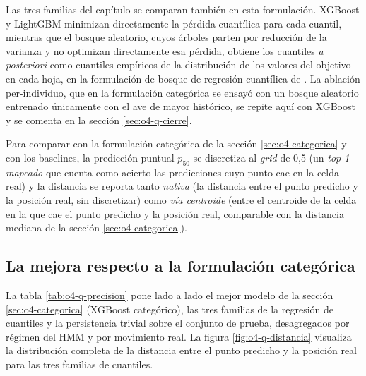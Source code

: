 Las tres familias del capítulo se comparan también en esta formulación. XGBoost y
LightGBM minimizan directamente la pérdida cuantílica para cada cuantil, mientras
que el bosque aleatorio, cuyos árboles parten por reducción de la varianza y no
optimizan directamente esa pérdida, obtiene los cuantiles \emph{a posteriori} como
cuantiles empíricos de la distribución de los valores del objetivo en cada hoja, en
la formulación de bosque de regresión cuantílica de \cite{meinshausen2006}. La
ablación per-individuo, que en la formulación categórica se ensayó con un bosque
aleatorio entrenado únicamente con el ave de mayor histórico, se repite aquí con
XGBoost y se comenta en la sección \ref{sec:o4-q-cierre}.

Para comparar con la formulación categórica de la sección \ref{sec:o4-categorica} y
con los baselines, la predicción puntual $p_{50}$ se discretiza al \textit{grid} de
0,5\textdegree{} (un \textit{top-1 mapeado} que cuenta como acierto las
predicciones cuyo punto cae en la celda real) y la distancia se reporta tanto
\emph{nativa} (la distancia entre el punto predicho y la posición real, sin
discretizar) como \emph{vía centroide} (entre el centroide de la celda en la que cae
el punto predicho y la posición real, comparable con la distancia mediana de la
sección \ref{sec:o4-categorica}).

\subsection{La mejora respecto a la formulación categórica}
\label{sec:o4-q-precision}

La tabla \ref{tab:o4-q-precision} pone lado a lado el mejor modelo de la sección
\ref{sec:o4-categorica} (XGBoost categórico), las tres familias de la regresión de
cuantiles y la persistencia trivial sobre el conjunto de prueba, desagregados por
régimen del HMM y por movimiento real. La figura \ref{fig:o4-q-distancia} visualiza
la distribución completa de la distancia entre el punto predicho y la posición
real para las tres familias de cuantiles.

